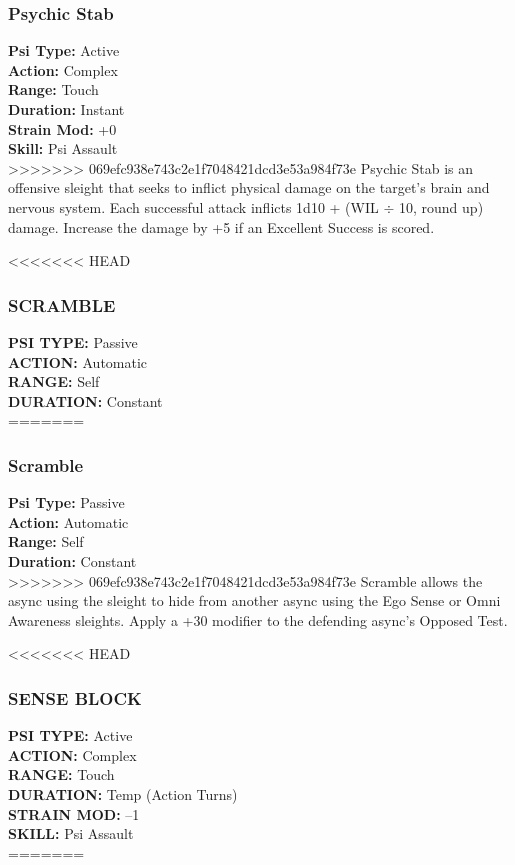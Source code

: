 \subsubsection{Psychic Stab}
\textbf{Psi Type:} Active \\ 
\textbf{Action:} Complex \\ 
\textbf{Range:} Touch \\ 
\textbf{Duration:} Instant \\
\textbf{Strain Mod:} +0 \\ 
\textbf{Skill:} Psi Assault \\
>>>>>>> 069efc938e743c2e1f7048421dcd3e53a984f73e
Psychic Stab is an offensive sleight that seeks to inflict
physical damage on the target’s brain and nervous
system. Each successful attack inflicts 1d10 + (WIL $\div$
10, round up) damage. Increase the damage by +5 if
an Excellent Success is scored.

<<<<<<< HEAD
\subsubsection{SCRAMBLE}
\textbf{PSI TYPE:} Passive \\ 
\textbf{ACTION:} Automatic \\ 
\textbf{RANGE:} Self \\ 
\textbf{DURATION:} Constant \\
=======
\subsubsection{Scramble}
\textbf{Psi Type:} Passive \\ 
\textbf{Action:} Automatic \\ 
\textbf{Range:} Self \\ 
\textbf{Duration:} Constant \\
>>>>>>> 069efc938e743c2e1f7048421dcd3e53a984f73e
Scramble allows the async using the sleight to hide
from another async using the Ego Sense or Omni
Awareness sleights. Apply a +30 modifier to the defending
async’s Opposed Test.

<<<<<<< HEAD
\subsubsection{SENSE BLOCK}
\textbf{PSI TYPE:} Active \\ 
\textbf{ACTION:} Complex \\ 
\textbf{RANGE:} Touch \\ 
\textbf{DURATION:} Temp (Action Turns) \\
\textbf{STRAIN MOD:} –1 \\ 
\textbf{SKILL:} Psi Assault \\
=======
